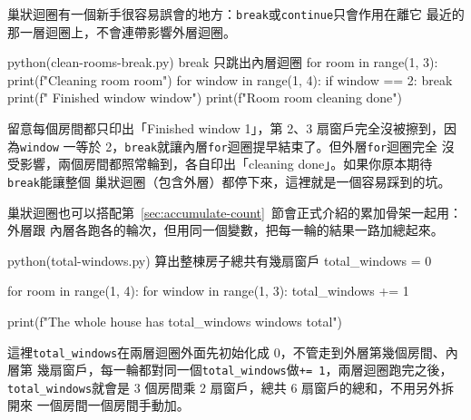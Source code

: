 巢狀迴圈有一個新手很容易誤會的地方：\texttt{break}或\texttt{continue}只會作用在離它
最近的那一層迴圈上，不會連帶影響外層迴圈。

\begin{example}{python}{(clean-rooms-break.py) break 只跳出內層迴圈}
for room in range(1, 3):
    print(f"Cleaning room {room}")
    for window in range(1, 4):
        if window == 2:
            break
        print(f"  Finished window {window}")
    print(f"Room {room} cleaning done")
\end{example}


留意每個房間都只印出「Finished window 1」，第 2、3 扇窗戶完全沒被擦到，因為\texttt{window}
一等於 2，\texttt{break}就讓內層\texttt{for}迴圈提早結束了。但外層\texttt{for}迴圈完全
沒受影響，兩個房間都照常輪到，各自印出「cleaning done」。如果你原本期待\texttt{break}能讓整個
巢狀迴圈（包含外層）都停下來，這裡就是一個容易踩到的坑。


巢狀迴圈也可以搭配第~\ref{sec:accumulate-count}~節會正式介紹的累加骨架一起用：外層跟
內層各跑各的輪次，但用同一個變數，把每一輪的結果一路加總起來。

\begin{example}{python}{(total-windows.py) 算出整棟房子總共有幾扇窗戶}
total_windows = 0

for room in range(1, 4):
    for window in range(1, 3):
        total_windows += 1

print(f"The whole house has {total_windows} windows total")
\end{example}


這裡\texttt{total\_windows}在兩層迴圈外面先初始化成 0，不管走到外層第幾個房間、內層第
幾扇窗戶，每一輪都對同一個\texttt{total\_windows}做\texttt{+= 1}，兩層迴圈跑完之後，
\texttt{total\_windows}就會是 3 個房間乘 2 扇窗戶，總共 6 扇窗戶的總和，不用另外拆開來
一個房間一個房間手動加。

